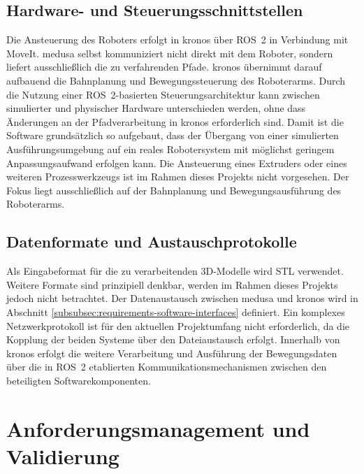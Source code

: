         \subsection{Hardware- und Steuerungsschnittstellen} \label{subsec:hardware-and-control-interfaces}
            Die Ansteuerung des Roboters erfolgt in \ac{kronos} über \ac{ROS}~2 in Verbindung mit MoveIt.
            \ac{medusa} selbst kommuniziert nicht direkt mit dem Roboter, sondern liefert ausschließlich die zu verfahrenden Pfade.
            \ac{kronos} übernimmt darauf aufbauend die Bahnplanung und Bewegungssteuerung des Roboterarms.
            Durch die Nutzung einer \ac{ROS}~2-basierten Steuerungsarchitektur kann zwischen simulierter und physischer Hardware unterschieden werden,
            ohne dass Änderungen an der Pfadverarbeitung in \ac{kronos} erforderlich sind.
            Damit ist die Software grundsätzlich so aufgebaut,
            dass der Übergang von einer simulierten Ausführungsumgebung auf ein reales Robotersystem mit möglichst geringem Anpassungsaufwand erfolgen kann.
            Die Ansteuerung eines Extruders oder eines weiteren Prozesswerkzeugs ist im Rahmen dieses Projekts nicht vorgesehen.
            Der Fokus liegt ausschließlich auf der Bahnplanung und Bewegungsausführung des Roboterarms.

        \subsection{Datenformate und Austauschprotokolle}\label{subsec:data-formats-and-exchange-protocols}
            Als Eingabeformat für die zu verarbeitenden 3D-Modelle wird \ac{STL} verwendet.
            Weitere Formate sind prinzipiell denkbar, werden im Rahmen dieses Projekts jedoch nicht betrachtet.
            Der Datenaustausch zwischen \ac{medusa} und \ac{kronos} wird in Abschnitt \ref{subsubsec:requirements-software-interfaces} definiert.
            Ein komplexes Netzwerkprotokoll ist für den aktuellen Projektumfang nicht erforderlich, da die Kopplung der beiden Systeme über den Dateiaustausch erfolgt.
            Innerhalb von \ac{kronos} erfolgt die weitere Verarbeitung und Ausführung der Bewegungsdaten über die in \ac{ROS}~2 etablierten Kommunikationsmechanismen zwischen den beteiligten Softwarekomponenten.
    \section{Anforderungsmanagement und Validierung} \label{sec:requirements-management-and-validation}

